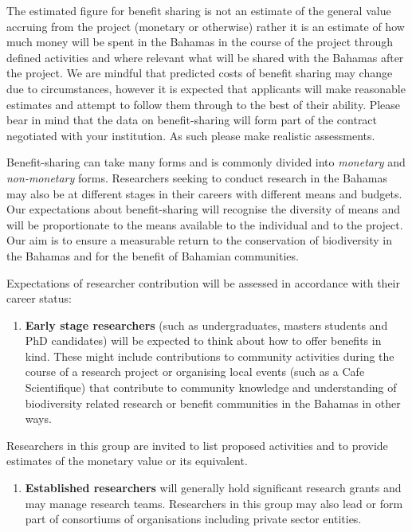 \documentclass[
]{book}
\providecommand{\tightlist}{%
  \setlength{\itemsep}{0pt}\setlength{\parskip}{0pt}}
\begin{document}
The estimated figure for benefit sharing is not an estimate of the general value accruing from the project (monetary or otherwise) rather it is an estimate of how much money will be spent in the Bahamas in the course of the project through defined activities and where relevant what will be shared with the Bahamas after the project. We are mindful that predicted costs of benefit sharing may change due to circumstances, however it is expected that applicants will make reasonable estimates and attempt to follow them through to the best of their ability. Please bear in mind that the data on benefit-sharing will form part of the contract negotiated with your institution. As such please make realistic assessments.

Benefit-sharing can take many forms and is commonly divided into \emph{monetary} and \emph{non-monetary} forms. Researchers seeking to conduct research in the Bahamas may also be at different stages in their careers with different means and budgets. Our expectations about benefit-sharing will recognise the diversity of means and will be proportionate to the means available to the individual and to the project. Our aim is to ensure a measurable return to the conservation of biodiversity in the Bahamas and for the benefit of Bahamian communities.

Expectations of researcher contribution will be assessed in accordance with their career status:

\begin{enumerate}
\def\labelenumi{\arabic{enumi}.}
\tightlist
\item
  \textbf{Early stage researchers} (such as undergraduates, masters students and PhD candidates) will be expected to think about how to offer benefits in kind. These might include contributions to community activities during the course of a research project or organising local events (such as a Cafe Scientifique) that contribute to community knowledge and understanding of biodiversity related research or benefit communities in the Bahamas in other ways.
\end{enumerate}

Researchers in this group are invited to list proposed activities and to provide estimates of the monetary value or its equivalent.

\begin{enumerate}
\def\labelenumi{\arabic{enumi}.}
\setcounter{enumi}{1}
\tightlist
\item
  \textbf{Established researchers} will generally hold significant research grants and may manage research teams. Researchers in this group may also lead or form part of consortiums of organisations including private sector entities.
\end{enumerate}
\end{document}
